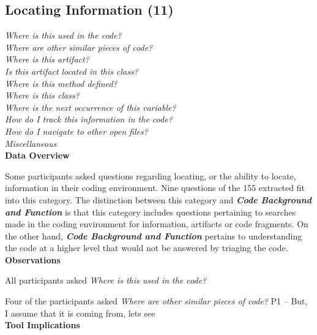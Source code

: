\documentclass[conference]{IEEEtran}
\begin{document}




\noindent\subsection{\textbf{Locating Information (11)}}\label{li}

\noindent\emph{Where is this used in the code?} \\
\emph{Where are other similar pieces of code?} \\
\emph{Where is this artifact?} \\
\emph{Is this artifact located in this class?} \\
\emph{Where is this method defined?} \\
\emph{Where is this class? } \\
\emph{Where is the next occurrence of this variable?} \\
\emph{How do I track this information in the code?} \\
\emph{How do I navigate to other open files?} \\
\emph{Miscellaneous} \\
 	
\noindent\textbf{Data Overview}

Some participants asked questions regarding locating, or the ability to locate, information in their coding environment. 
Nine questions of the 155 extracted fit into this category.
The distinction between this category and \emph{\textbf{Code Background and Function}} is that this category includes questions pertaining to searches made in the coding environment for information, artifacts or code fragments. 
On the other hand, \emph{\textbf{Code Background and Function}} pertains to understanding the code at a higher level that would not be answered by triaging the code.
\\

\noindent\textbf{Observations}

All participants asked \textit{Where is this used in the code?}

Four of the participants asked \textit{Where are other similar pieces of code?}
P1 -- But, I assume that it is coming from, lets see
\\

\noindent\textbf{Tool Implications}
\end{document}

